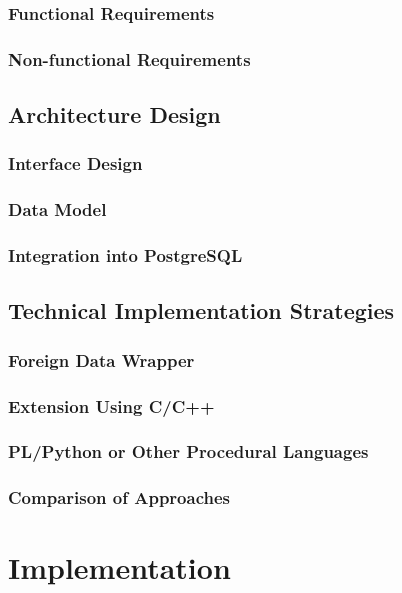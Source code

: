 \documentclass{article}
\begin{document}
\subsubsection{Functional Requirements}
\subsubsection{Non-functional Requirements}

\subsection{Architecture Design}
\subsubsection{Interface Design}
\subsubsection{Data Model}
\subsubsection{Integration into PostgreSQL}

\subsection{Technical Implementation Strategies}
\subsubsection{Foreign Data Wrapper}
\subsubsection{Extension Using C/C++}
\subsubsection{PL/Python or Other Procedural Languages}
\subsubsection{Comparison of Approaches}

\newpage

\section{Implementation}
\end{document}
